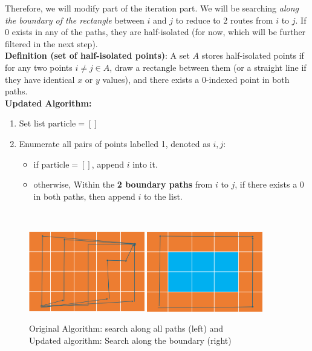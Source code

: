 \documentclass[11pt,a4paper]{scrartcl}
\begin{document}
Therefore, we will modify part of the iteration part. We will be searching \textit{along the boundary of the rectangle} between $i$ and $j$ to reduce to 2 routes from $i$ to $j$. If 0 exists in any of the paths, they are half-isolated (for now, which will be further filtered in the next step). \\

\textbf{Definition (set of half-isolated points)}: A set $A$ stores half-isolated points if for any two points $i \neq j \in A$, draw a rectangle between them (or a straight line if they have identical $x$ or $y$ values), and there exists a 0-indexed point in both paths. \\

\textbf{Updated Algorithm:}
\begin{enumerate}
    \item Set list $\text{particle} = []$
    \item Enumerate all pairs of points labelled 1, denoted as $i, j$:
    \begin{itemize}
        \item if $\text{particle} = []$, append $i$ into it. 
        \item otherwise, Within the \textbf{2 boundary paths} from $i$ to $j$, if there exists a 0 in both paths, then append $i$ to the list.
    \end{itemize}
\end{enumerate}\\

\begin{figure}[h]
    \begin{center}
        \includegraphics[width = 0.45\textwidth]{img/illustration_allPaths.png}
        \includegraphics[width = 0.45\textwidth]{img/illustration_boundary.png}
        \caption{Original Algorithm: search along all paths (left) and \\
        Updated algorithm: Search along the boundary (right)}
    \end{center}
\end{figure}
\end{document}
